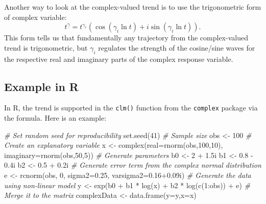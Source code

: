 \documentclass[
]{book}
\newenvironment{Shaded}{\begin{snugshade}}{\end{snugshade}}
\newcommand{\AttributeTok}[1]{\textcolor[rgb]{0.77,0.63,0.00}{#1}}
\newcommand{\CommentTok}[1]{\textcolor[rgb]{0.56,0.35,0.01}{\textit{#1}}}
\newcommand{\DecValTok}[1]{\textcolor[rgb]{0.00,0.00,0.81}{#1}}
\newcommand{\FloatTok}[1]{\textcolor[rgb]{0.00,0.00,0.81}{#1}}
\newcommand{\FunctionTok}[1]{\textcolor[rgb]{0.00,0.00,0.00}{#1}}
\newcommand{\NormalTok}[1]{#1}
\newcommand{\OtherTok}[1]{\textcolor[rgb]{0.56,0.35,0.01}{#1}}
\newcommand{\SpecialCharTok}[1]{\textcolor[rgb]{0.00,0.00,0.00}{#1}}
\begin{document}
Another way to look at the complex-valued trend is to use the trigonometric form of complex variable:
\begin{equation}
    t^{\underline{\gamma}} = t^{\gamma_r} \left(\cos (\gamma_i \ln t) + i \sin (\gamma_i \ln t) \right) .
    \label{eq:trendTrig}
\end{equation}
This form tells us that fundamentally any trajectory from the complex-valued trend is trigonometric, but \(\gamma_i\) regulates the strength of the cosine/sine waves for the respective real and imaginary parts of the complex response variable.

\hypertarget{example-in-r}{%
\subsection{Example in R}\label{example-in-r}}

In R, the trend is supported in the \texttt{clm()} function from the \texttt{complex} package via the formula. Here is an example:

\begin{Shaded}
\begin{Highlighting}[]
\CommentTok{\# Set random seed for reproducibility}
\FunctionTok{set.seed}\NormalTok{(}\DecValTok{41}\NormalTok{)}
\CommentTok{\# Sample size}
\NormalTok{obs }\OtherTok{\textless{}{-}} \DecValTok{100}
\CommentTok{\# Create an explanatory variable}
\NormalTok{x }\OtherTok{\textless{}{-}} \FunctionTok{complex}\NormalTok{(}\AttributeTok{real=}\FunctionTok{rnorm}\NormalTok{(obs,}\DecValTok{100}\NormalTok{,}\DecValTok{10}\NormalTok{), }\AttributeTok{imaginary=}\FunctionTok{rnorm}\NormalTok{(obs,}\DecValTok{50}\NormalTok{,}\DecValTok{5}\NormalTok{))}
\CommentTok{\# Generate parameters}
\NormalTok{b0 }\OtherTok{\textless{}{-}} \DecValTok{2} \SpecialCharTok{+} \FloatTok{1.5}\NormalTok{i}
\NormalTok{b1 }\OtherTok{\textless{}{-}} \FloatTok{0.8} \SpecialCharTok{{-}} \FloatTok{0.4}\NormalTok{i}
\NormalTok{b2 }\OtherTok{\textless{}{-}} \FloatTok{0.5} \SpecialCharTok{+} \FloatTok{0.2}\NormalTok{i}
\CommentTok{\# Generate error term from the complex normal distribution}
\NormalTok{e }\OtherTok{\textless{}{-}} \FunctionTok{rcnorm}\NormalTok{(obs, }\DecValTok{0}\NormalTok{, }\AttributeTok{sigma2=}\FloatTok{0.25}\NormalTok{, }\AttributeTok{varsigma2=}\FloatTok{0.16+0.09}\NormalTok{i)}
\CommentTok{\# Generate the data using non{-}linear model}
\NormalTok{y }\OtherTok{\textless{}{-}} \FunctionTok{exp}\NormalTok{(b0 }\SpecialCharTok{+}\NormalTok{ b1 }\SpecialCharTok{*} \FunctionTok{log}\NormalTok{(x) }\SpecialCharTok{+}\NormalTok{ b2 }\SpecialCharTok{*} \FunctionTok{log}\NormalTok{(}\FunctionTok{c}\NormalTok{(}\DecValTok{1}\SpecialCharTok{:}\NormalTok{obs)) }\SpecialCharTok{+}\NormalTok{ e)}
\CommentTok{\# Merge it to the matrix}
\NormalTok{complexData }\OtherTok{\textless{}{-}} \FunctionTok{data.frame}\NormalTok{(}\AttributeTok{y=}\NormalTok{y,}\AttributeTok{x=}\NormalTok{x)}
\end{Highlighting}
\end{Shaded}
\end{document}
